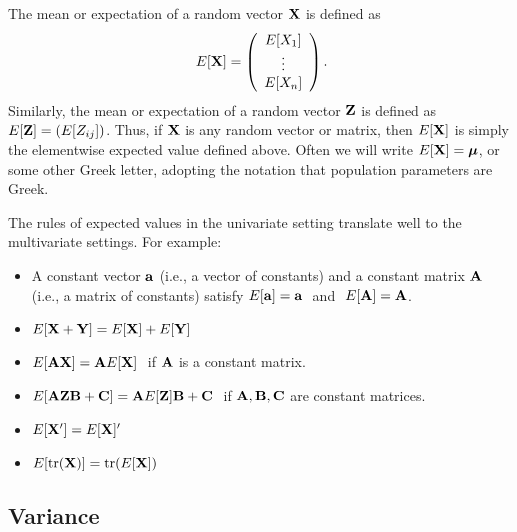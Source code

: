 The mean or expectation of a random vector $\mathbf{X}$ is defined as $$\ E[\mathbf{X}] =
\left(\begin{array}{c}E[X_1]\\ \vdots\\E[X_n]\end{array}\right).$$ Similarly, the mean  or expectation of a random vector $\mathbf{Z}$ is defined as $E[\mathbf{Z}]=(E[Z_{ij}])$.
Thus, if $\mathbf{X}$ is any random vector or matrix, then $E[\mathbf{X}]$  is 
simply the elementwise expected value defined above. Often
we will write $E[\mathbf{X}] = \boldsymbol{\mu}$, or some other Greek letter,
adopting the notation that population parameters are Greek.


The rules of expected values in the univariate setting translate well to the multivariate settings. For example:
\begin{itemize}
\item A constant vector $\mathbf{a}$ (i.e., a vector of constants) and a constant matrix
$\mathbf{A}$ (i.e., a matrix of constants) satisfy $E[\mathbf{a}]=\mathbf{a}\ $ and
$\ E[\mathbf{A}]=\mathbf{A}$.

\item $E[\mathbf{X}+\mathbf{Y}]=E[\mathbf{X}]+E[\mathbf{Y}]$

\item$E[\mathbf{A}\mathbf{X}]=\mathbf{A} E[\mathbf{X}]\ $ if  $\mathbf{A}$ is a constant matrix.

\item $E[\mathbf{A}\mathbf{Z}\mathbf{B}+\mathbf{C}]=\mathbf{A} E[\mathbf{Z}]\mathbf{B} + \mathbf{C}\ $ if  $\mathbf{A},\mathbf{B},\mathbf{C}$ are constant matrices. 

\item $E[{\mathbf{X}}'] = E[{\mathbf{X}}]'$

\item $E[\mbox{tr}({\mathbf{X}})] = \mbox{tr}(E[{\mathbf{X}}])$
\end{itemize}



\subsection{Variance}


